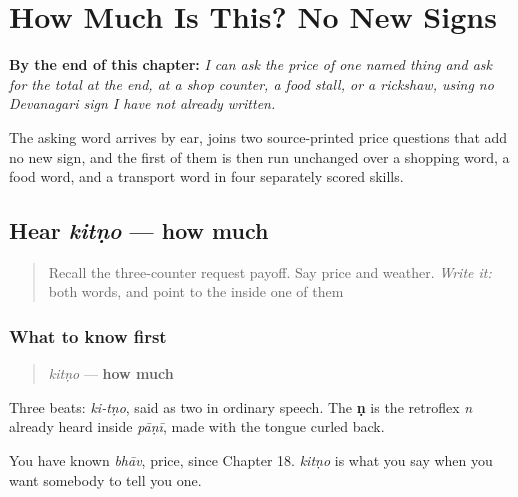 
\chapter{How Much Is This? No New Signs}
\label{ch:mw-price-question}

\begin{chapteropening}
\textbf{By the end of this chapter:} \emph{I can ask the price of one named thing and ask for the total at the end, at a shop counter, a food stall, or a rickshaw, using no Devanagari sign I have not already written.}

The asking word arrives by ear, joins two source-printed price questions that add no new sign, and the first of them is then run unchanged over a shopping word, a food word, and a transport word in four separately scored skills.
\end{chapteropening}

\section[kitṇo]{Hear \emph{kitṇo} — how much}

\label{lesson:MW-C22-hear-kitno}



\begin{quote}
Recall the three-counter request payoff. Say price and weather. \emph{Write it:} both words, and point to the \textbf{} inside one of them
\end{quote}

\subsection*{What to know first}
\begin{quote}
\emph{kitṇo} — \textbf{how much}
\end{quote}

Three beats: \emph{ki-tṇo}, said as two in ordinary speech. The \textbf{ṇ} is the retroflex \emph{n} already heard inside \emph{pāṇī}, made with the tongue curled back.

You have known \emph{bhāv}, price, since Chapter 18. \emph{kitṇo} is what you say when you want somebody to tell you one.

